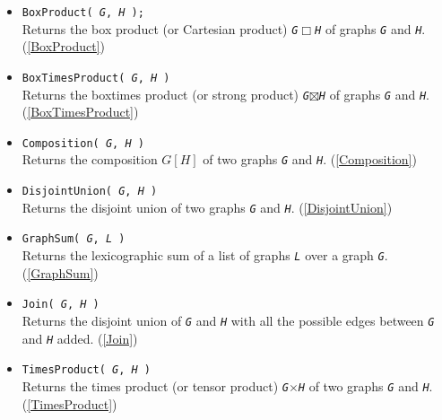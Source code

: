 \documentclass[a4paper,11pt]{report}
\begin{document}
{{\begin{itemize}
\item \texttt{BoxProduct( \mbox{\texttt{\mdseries\slshape G}}, \mbox{\texttt{\mdseries\slshape H}} );}\\
 Returns the box product (or Cartesian product) \mbox{\texttt{\mdseries\slshape G}}$\Box$\mbox{\texttt{\mdseries\slshape H}} of graphs \mbox{\texttt{\mdseries\slshape G}} and \mbox{\texttt{\mdseries\slshape H}}. (\ref{BoxProduct}) 
\item \texttt{BoxTimesProduct( \mbox{\texttt{\mdseries\slshape G}}, \mbox{\texttt{\mdseries\slshape H}} )}\\
 Returns the boxtimes product (or strong product) \mbox{\texttt{\mdseries\slshape G}}$\boxtimes$\mbox{\texttt{\mdseries\slshape H}} of graphs \mbox{\texttt{\mdseries\slshape G}} and \mbox{\texttt{\mdseries\slshape H}}. (\ref{BoxTimesProduct}) 
\item \texttt{Composition( \mbox{\texttt{\mdseries\slshape G}}, \mbox{\texttt{\mdseries\slshape H}} )}\\
 Returns the composition $G[H]$ of two graphs \mbox{\texttt{\mdseries\slshape G}} and \mbox{\texttt{\mdseries\slshape H}}. (\ref{Composition}) 
\item \texttt{DisjointUnion( \mbox{\texttt{\mdseries\slshape G}}, \mbox{\texttt{\mdseries\slshape H}} )}\\
 Returns the disjoint union of two graphs \mbox{\texttt{\mdseries\slshape G}} and \mbox{\texttt{\mdseries\slshape H}}. (\ref{DisjointUnion}) 
\item \texttt{GraphSum( \mbox{\texttt{\mdseries\slshape G}}, \mbox{\texttt{\mdseries\slshape L}} )}\\
 Returns the lexicographic sum of a list of graphs \mbox{\texttt{\mdseries\slshape L}} over a graph \mbox{\texttt{\mdseries\slshape G}}. (\ref{GraphSum}) 
\item \texttt{Join( \mbox{\texttt{\mdseries\slshape G}}, \mbox{\texttt{\mdseries\slshape H}} )}\\
 Returns the disjoint union of \mbox{\texttt{\mdseries\slshape G}} and \mbox{\texttt{\mdseries\slshape H}} with all the possible edges between \mbox{\texttt{\mdseries\slshape G}} and \mbox{\texttt{\mdseries\slshape H}} added. (\ref{Join}) 
\item \texttt{TimesProduct( \mbox{\texttt{\mdseries\slshape G}}, \mbox{\texttt{\mdseries\slshape H}} )}\\
 Returns the times product (or tensor product) \mbox{\texttt{\mdseries\slshape G}}$\times$\mbox{\texttt{\mdseries\slshape H}} of two graphs \mbox{\texttt{\mdseries\slshape G}} and \mbox{\texttt{\mdseries\slshape H}}. (\ref{TimesProduct}) 
\end{itemize}
 }

}
\end{document}
